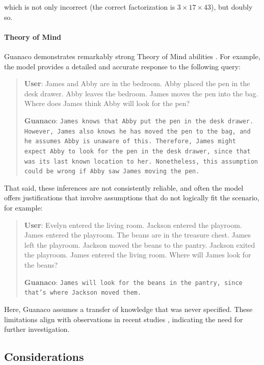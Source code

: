 which is not only incorrect (the correct factorization is $3 \times 17 \times 43$), but doubly so.

\paragraph{Theory of Mind} {Guanaco} demonstrates remarkably strong Theory of Mind abilities \cite{nematzadeh2018evaluating, sap2022neural}. For example, the model provides a detailed and accurate response to the following query:

\begin{quote}
    \textbf{User}: James and Abby are in the bedroom. Abby placed the pen in the desk drawer. Abby leaves the bedroom. James moves the pen into the bag. Where does James think Abby will look for the pen?

    \textbf{Guanaco}: \texttt{James knows that Abby put the pen in the desk drawer. However, James also knows he has moved the pen to the bag, and he assumes Abby is unaware of this. Therefore, James might expect Abby to look for the pen in the desk drawer, since that was its last known location to her. Nonetheless, this assumption could be wrong if Abby saw James moving the pen.}
\end{quote}

That said, these inferences are not consistently reliable, and often the model offers justifications that involve assumptions that do not logically fit the scenario, for example:

\begin{quote}
    \textbf{User}: Evelyn entered the living room. Jackson entered the playroom. James entered the playroom. The beans are in the treasure chest. James left the playroom. Jackson moved the beans to the pantry. Jackson exited the playroom. James entered the living room. Where will James look for the beans?

    \textbf{Guanaco}: \texttt{James will look for the beans in the pantry, since that's where Jackson moved them.}
\end{quote}

Here, {Guanaco} assumes a transfer of knowledge that was never specified. These limitations align with observations in recent studies \cite{sap2022neural}, indicating the need for further investigation.

\subsection{Considerations}
\label{ssec:considerations}

